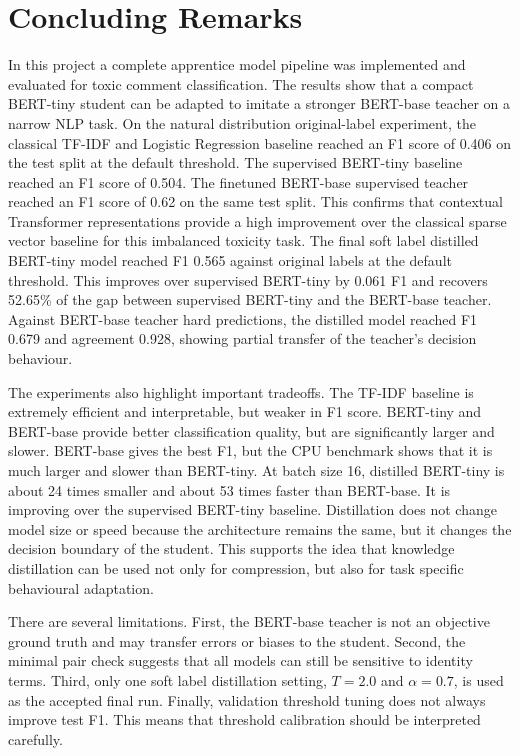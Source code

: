 \documentclass[pdflatex,sn-mathphys-num]{sn-jnl}
\begin{document}
\section{Concluding Remarks}\label{sec:conclusion}

In this project a complete apprentice model pipeline was implemented and evaluated for toxic comment classification.
The results show that a compact BERT-tiny student can be adapted to imitate a stronger BERT-base teacher on a narrow NLP task.
On the natural distribution original-label experiment, the classical TF-IDF and Logistic Regression baseline reached an F1 score of 0.406 on the test split at the default threshold.
The supervised BERT-tiny baseline reached an F1 score of 0.504.
The finetuned BERT-base supervised teacher reached an F1 score of 0.62 on the same test split.
This confirms that contextual Transformer representations provide a high improvement over the classical sparse vector baseline for this imbalanced toxicity task.
The final soft label distilled BERT-tiny model reached F1 0.565 against original labels at the default threshold.
This improves over supervised BERT-tiny by 0.061 F1 and recovers 52.65\% of the gap between supervised BERT-tiny and the BERT-base teacher.
Against BERT-base teacher hard predictions, the distilled model reached F1 0.679 and agreement 0.928, showing partial transfer of the teacher's decision behaviour.

The experiments also highlight important tradeoffs.
The TF-IDF baseline is extremely efficient and interpretable, but weaker in F1 score.
BERT-tiny and BERT-base provide better classification quality, but are significantly larger and slower.
BERT-base gives the best F1, but the CPU benchmark shows that it is much larger and slower than BERT-tiny.
At batch size 16, distilled BERT-tiny is about 24 times smaller and about 53 times faster than BERT-base.
It is improving over the supervised BERT-tiny baseline.
Distillation does not change model size or speed because the architecture remains the same, but it changes the decision boundary of the student.
This supports the idea that knowledge distillation can be used not only for compression, but also for task specific behavioural adaptation.

There are several limitations.
First, the BERT-base teacher is not an objective ground truth and may transfer errors or biases to the student.
Second, the minimal pair check suggests that all models can still be sensitive to identity terms.
Third, only one soft label distillation setting, $T=2.0$ and $\alpha=0.7$, is used as the accepted final run.
Finally, validation threshold tuning does not always improve test F1.
This means that threshold calibration should be interpreted carefully.
\end{document}
